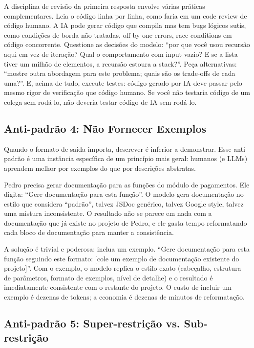 A disciplina de revisão da primeira resposta envolve várias práticas complementares.
Leia o código linha por linha, como faria em um code review de código humano. A
IA pode gerar código que compila mas tem bugs lógicos sutis, como condições de
borda não tratadas, off-by-one errors, race conditions em código concorrente.
Questione as decisões do modelo: ``por que você usou recursão aqui em vez de
iteração? Qual o comportamento com input vazio? E se a lista tiver um milhão de
elementos, a recursão estoura a stack?''. Peça alternativas: ``mostre outra
abordagem para este problema; quais são os trade-offs de cada uma?''. E, acima de
tudo, execute testes: código gerado por IA deve passar pelo mesmo rigor de
verificação que código humano. Se você não testaria código de um colega sem
rodá-lo, não deveria testar código de IA sem rodá-lo.

\subsection{Anti-padrão 4: Não Fornecer Exemplos}

Quando o formato de saída importa, descrever é inferior a demonstrar. Esse
anti-padrão é uma instância específica de um princípio mais geral: humanos (e
LLMs) aprendem melhor por exemplos do que por descrições abstratas.

Pedro precisa gerar documentação para as funções do módulo de pagamentos. Ele
digita: ``Gere documentação para esta função''. O modelo gera documentação no
estilo que considera ``padrão'', talvez JSDoc genérico, talvez Google style,
talvez uma mistura inconsistente. O resultado não se parece em nada com a
documentação que já existe no projeto de Pedro, e ele gasta tempo reformatando
cada bloco de documentação para manter a consistência.

A solução é trivial e poderosa: inclua um exemplo. ``Gere documentação para esta
função seguindo este formato: [cole um exemplo de documentação existente do
projeto]''. Com o exemplo, o modelo replica o estilo exato (cabeçalho,
estrutura de parâmetros, formato de exemplos, nível de detalhe) e o resultado
é imediatamente consistente com o restante do projeto. O custo de incluir um
exemplo é dezenas de tokens; a economia é dezenas de minutos de reformatação.

\subsection{Anti-padrão 5: Super-restrição vs. Sub-restrição}

